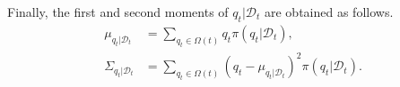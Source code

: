 \documentclass[letterpaper, 10 pt, conference]{ieeeconf}
\newcommand{\set}[1]{\{#1\}} \newcommand{\norm}[1]{\|#1\|}
\newcommand{\mc}[1]{\mathcal{#1}} \newcommand{\mb}[1]{\mathbf{#1}}
\newcommand{\Integer}{\mathbb{Z}}
\newcommand{\N}{\mc{N}}
\newcommand{\changed}[2]{{\color{blue} #2}}
\newcommand{\D}[2]{\mc{D}_{#2}}
\newcommand{\q}[1]{{q_{#1}}}
\begin{document}
Finally, the first and second moments of ${q_t|\D{}{t}}$ are obtained as follows.
\begin{equation*}
\begin{split}
\mu_{q_t|\D{}{t}} & = \sum\limits_{q_t \in \Omega(t)} q_t \pi\left(q_t|\D{}{t}\right),\\
\Sigma_{q_t|\D{}{t}} &= \sum\limits_{q_t \in \Omega(t)} \left(q_t-\mu_{q_t|\D{}{t}}\right)^2 \pi\left(q_t|\D{}{t}\right).
\end{split}
\end{equation*}
% 
%
%					
% 
\end{document}
